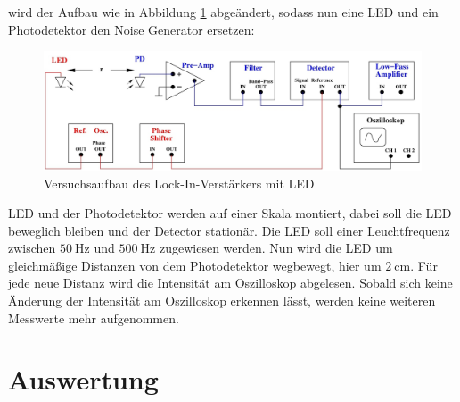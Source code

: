 \justifying wird der Aufbau wie in Abbildung \ref{fig:2} abgeändert, sodass nun eine LED und ein Photodetektor den 
Noise Generator ersetzen:

\begin{figure}[H]
    \centering
    \includegraphics[width=\linewidth]{./images/lock-in_led.jpg}
    \caption{Versuchsaufbau des Lock-In-Verstärkers mit LED \cite{V303}}
    \label{fig:2}
\end{figure}

\justifying LED  und der Photodetektor werden auf einer Skala montiert, dabei soll die LED beweglich bleiben und der Detector stationär.
Die LED soll einer Leuchtfrequenz zwischen $\SI{50}{\hertz}$ und $\SI{500}{\hertz}$ zugewiesen werden. Nun wird die LED um gleichmäßige Distanzen
von dem Photodetektor wegbewegt, hier um $\SI{2}{\centi\meter}$. Für jede neue Distanz wird die Intensität am Oszilloskop abgelesen. Sobald sich keine
Änderung der Intensität am Oszilloskop erkennen lässt, werden keine weiteren Messwerte mehr aufgenommen.  


\section{Auswertung}
\newpage

